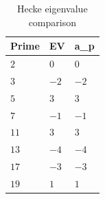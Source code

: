 \begin{table}[ht]
\centering
\begin{tabular}{lll}
\toprule
Prime & EV & a_p \\
\midrule
$2$ & $0$ & $0$ \\
$3$ & $-2$ & $-2$ \\
$5$ & $3$ & $3$ \\
$7$ & $-1$ & $-1$ \\
$11$ & $3$ & $3$ \\
$13$ & $-4$ & $-4$ \\
$17$ & $-3$ & $-3$ \\
$19$ & $1$ & $1$ \\
\bottomrule
\end{tabular}
\caption{Hecke eigenvalue comparison}
\label{tab:hecke}
\end{table}

